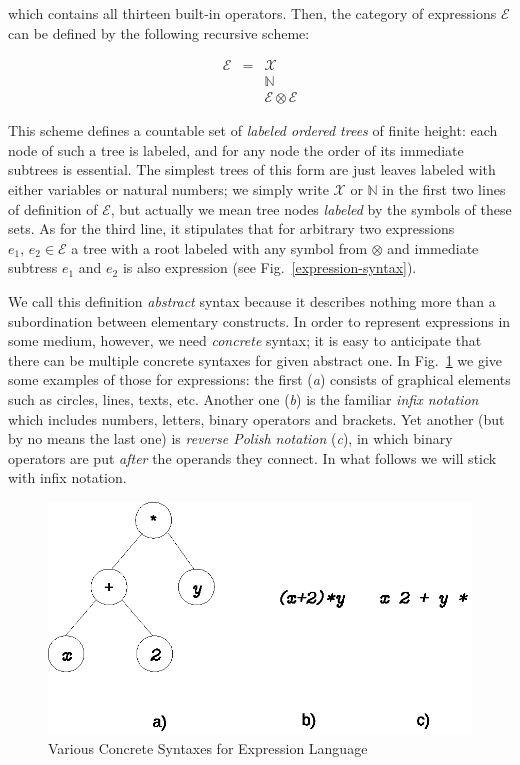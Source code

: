 which contains all thirteen built-in \lama operators. Then, the category of expressions $\mathscr{E}$ can be defined by
the following recursive scheme:

\[
\begin{array}{rcl}
  \mathscr{E} & = & \mathscr{X} \\
              &   & \mathbb{N} \\
              &   & \mathscr{E}\otimes\mathscr{E}
\end{array}
\]

This scheme defines a countable set of \emph{labeled ordered trees} of finite height: each node of such a tree is labeled, and for any node the order
of its immediate subtrees is essential. The simplest trees of this form are just leaves labeled with either variables or natural numbers; we simply
write $\mathscr{X}$ or $\mathbb{N}$ in the first two lines of definition of $\mathscr{E}$, but actually we mean tree nodes \emph{labeled} by the symbols of
these sets. As for the third line, it stipulates that for arbitrary two expressions $e_1,\,e_2\in\mathscr{E}$ a tree with a root labeled with any symbol
from $\otimes$ and immediate subtress $e_1$ and $e_2$ is also expression (see Fig.~\ref{expression-syntax}).

We call this definition \emph{abstract} syntax because it describes nothing more than a subordination between elementary constructs. In order to represent
expressions in some medium, however, we need \emph{concrete} syntax; it is easy to anticipate that there can be multiple concrete syntaxes for given
abstract one. In Fig.~\ref{expression-concrete} we give some examples of those for expressions: the first (\emph{a}) consists of graphical elements such as
circles, lines, texts, etc. Another one (\emph{b}) is the familiar \emph{infix notation} which includes numbers, letters, binary
operators and brackets. Yet another (but by no means the last one) is \emph{reverse Polish notation} (\emph{c}), in which binary operators are
put \emph{after} the operands they connect. In what follows we will stick with infix notation.

\begin{figure}[t]
  \centering
  \includegraphics[scale=0.7]{images/02-02.eps}
  \caption{Various Concrete Syntaxes for Expression Language}
  \label{expression-concrete}
\end{figure}

